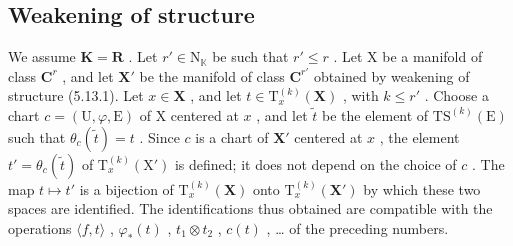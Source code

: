 \subsection{Weakening of structure}

We assume \(\mathbf{K} = \mathbf{R}\) . Let \(r' \in \mathrm{N}_{\mathbb{K}}\) be such that \(r' \leqslant r\) . Let X be a manifold of class \(\mathbf{C}^{r}\) , and let \(\mathbf{X}'\) be the manifold of class \(\mathbf{C}^{r'}\) obtained by weakening of structure (5.13.1). Let \(x \in \mathbf{X}\) , and let \(t \in \mathrm{T}_x^{(k)}(\mathbf{X})\) , with \(k \leqslant r'\) . Choose a chart \(c = (\mathrm{U}, \varphi, \mathrm{E})\) of X centered at \(x\) , and let \(\tilde{t}\) be the element of \(\mathrm{TS}^{(k)}(\mathrm{E})\) such that \(\theta_c(\tilde{t}) = t\) . Since \(c\) is a chart of \(\mathbf{X}'\) centered at \(x\) , the element \(t' = \theta_c(\tilde{t})\) of \(\mathrm{T}_x^{(k)}(\mathrm{X}')\) is defined; it does not depend on the choice of \(c\) . The map \(t \mapsto t'\) is a bijection of \(\mathrm{T}_x^{(k)}(\mathbf{X})\) onto \(\mathrm{T}_x^{(k)}(\mathbf{X}')\) by which these two spaces are identified. The identifications thus obtained are compatible with the operations \(\langle f, t \rangle\) , \(\varphi_*(t)\) , \(t_1 \otimes t_2\) , \(c(t)\) , \ldots{} of the preceding numbers.

